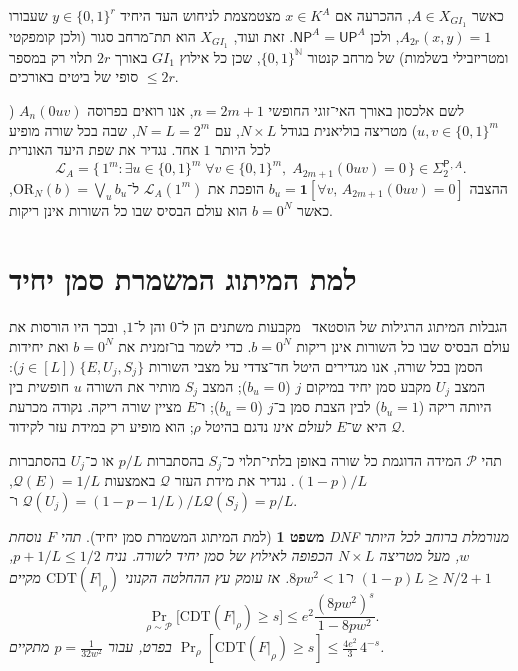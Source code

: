 \documentclass[11pt,a4paper]{article}
\newtheorem{theorem}{משפט}[section]
\theoremstyle{definition}
\theoremstyle{remark}
\newcommand{\NP}{\mathsf{NP}}
\newcommand{\UP}{\mathsf{UP}}
\newcommand{\SigTwo}{\Sigma_2^{\mathsf{P}}}
\newcommand{\CDT}{\mathrm{CDT}}
\newcommand{\OR}{\mathrm{OR}}
\newcommand{\Prb}{\Pr}
\newcommand{\GI}{GI_1}
\newcommand{\EN}[1]{\textenglish{#1}}
\begin{document}
כאשר $A \in X_{\GI}$, ההכרעה אם $x \in K^A$ מצטמצמת לניחוש העד היחיד $y \in \{0,1\}^r$ שעבורו $A_{2r}(x, y) = 1$, ולכן $\NP^A = \UP^A$. זאת ועוד, $X_{\GI}$ הוא תת־מרחב סגור (ולכן קומפקטי ומטריזבילי בשלמות) של מרחב קנטור $\{0,1\}^{\mathbb{N}}$, שכן כל אילוץ $\GI$ באורך $2r$ תלוי רק במספר סופי של ביטים באורכים $\le 2r$.

לשם אלכסון באורך האי־זוגי החופשי $n = 2m + 1$, אנו רואים בפרוסה $A_n(0uv)$ ($u, v \in \{0,1\}^m$) מטריצה בוליאנית בגודל $N \times L$, עם $N = L = 2^m$, שבה בכל שורה מופיע לכל היותר $1$ אחד. נגדיר את שפת היעד האונרית
\[
  \mathcal{L}_A = \bigl\{\, 1^m : \exists u \in \{0,1\}^m\; \forall v \in \{0,1\}^m,\; A_{2m+1}(0uv) = 0 \,\bigr\} \in \SigTwo{}^{,A}.
\]
ההצבה $b_u = \mathbf{1}[\forall v,\, A_{2m+1}(0uv) = 0]$ הופכת את $\mathcal{L}_A(1^m)$ ל־$\OR_N(b) = \bigvee_{u} b_u$, כאשר $b = 0^N$ הוא עולם הבסיס שבו כל השורות אינן ריקות.

\section{למת המיתוג המשמרת סמן יחיד}

הגבלות המיתוג הרגילות של הוסטאד~\cite{Hastad1986} מקבעות משתנים הן ל־$0$ והן ל־$1$, ובכך היו הורסות את עולם הבסיס שבו כל השורות אינן ריקות $b = 0^N$. כדי לשמר בו־זמנית את $b = 0^N$ ואת יחידות הסמן בכל שורה, אנו מגדירים היטל חד־צדדי על מצבי השורות $\{E, U_j, S_j\}$ ($j \in [L]$): המצב $U_j$ מקבע סמן יחיד במיקום $j$ ($b_u = 0$); המצב $S_j$ מותיר את השורה $u$ חופשית בין היותה ריקה ($b_u = 1$) לבין הצבת סמן ב־$j$ ($b_u = 0$); ו־$E$ מציין שורה ריקה. נקודה מכרעת היא ש־$E$ \emph{לעולם אינו} נדגם בהיטל $\rho$; הוא מופיע רק במידת עזר לקידוד $\mathcal{Q}$.

תהי $\mathcal{P}$ המידה הדוגמת כל שורה באופן בלתי־תלוי כ־$S_j$ בהסתברות $p/L$ או כ־$U_j$ בהסתברות $(1-p)/L$. נגדיר את מידת העזר $\mathcal{Q}$ באמצעות $\mathcal{Q}(E) = 1/L$, $\mathcal{Q}(U_j) = (1 - p - 1/L)/L$ ו־$\mathcal{Q}(S_j) = p/L$.

\begin{theorem}[למת המיתוג המשמרת סמן יחיד]
\label{thm:singleton-switching}
תהי $F$ נוסחת \EN{DNF} מנורמלת ברוחב לכל היותר $w$, מעל מטריצה $N \times L$ הכפופה לאילוץ של סמן יחיד לשורה. נניח $p + 1/L \le 1/2$, $(1 - p)L \ge N/2 + 1$ ו־$8pw^2 < 1$. אז עומק עץ ההחלטה הקנוני $\CDT(F|_\rho)$ מקיים
\[
  \Prb_{\rho \sim \mathcal{P}}\bigl[\CDT(F|_\rho) \ge s\bigr]
  \le e^2 \frac{(8pw^2)^s}{1 - 8pw^2}.
\]
בפרט, עבור $p = \frac{1}{32w^2}$ מתקיים $\Prb_\rho[\CDT(F|_\rho) \ge s] \le \frac{4e^2}{3}\, 4^{-s}$.
\end{theorem}
\end{document}
